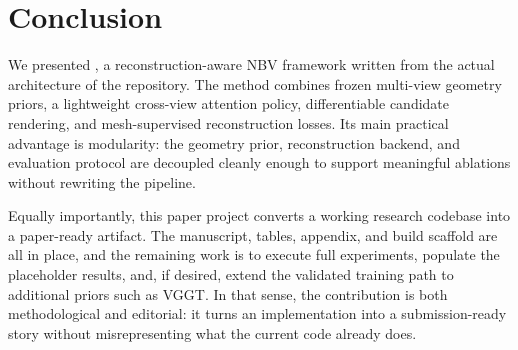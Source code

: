 \section{Conclusion}
\label{sec:conclusion}

We presented \method, a reconstruction-aware NBV framework written from the actual architecture of the \codebase repository. The method combines frozen multi-view geometry priors, a lightweight cross-view attention policy, differentiable candidate rendering, and mesh-supervised reconstruction losses. Its main practical advantage is modularity: the geometry prior, reconstruction backend, and evaluation protocol are decoupled cleanly enough to support meaningful ablations without rewriting the pipeline.

Equally importantly, this paper project converts a working research codebase into a paper-ready artifact. The manuscript, tables, appendix, and build scaffold are all in place, and the remaining work is to execute full experiments, populate the placeholder results, and, if desired, extend the validated training path to additional priors such as VGGT. In that sense, the contribution is both methodological and editorial: it turns an implementation into a submission-ready story without misrepresenting what the current code already does.

